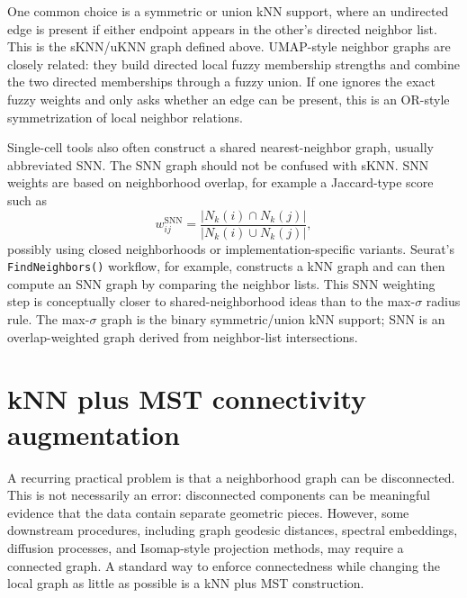 \documentclass[11pt]{article}
\begin{document}
One common choice is a symmetric or union kNN support, where an undirected edge is present if
either endpoint appears in the other's directed neighbor list.  This is the sKNN/uKNN graph
defined above.  UMAP-style neighbor graphs are closely related: they build directed local
fuzzy membership strengths and combine the two directed memberships through a fuzzy union.
If one ignores the exact fuzzy weights and only asks whether an edge can be present, this is
an OR-style symmetrization of local neighbor relations.

Single-cell tools also often construct a shared nearest-neighbor graph, usually abbreviated
SNN.  The SNN graph should not be confused with sKNN.  SNN weights are based on neighborhood
overlap, for example a Jaccard-type score such as
\[
  w^{\mathrm{SNN}}_{ij}
  =
  \frac{\lvert N_k(i)\cap N_k(j)\rvert}
       {\lvert N_k(i)\cup N_k(j)\rvert},
\]
possibly using closed neighborhoods or implementation-specific variants.  Seurat's
\texttt{FindNeighbors()} workflow, for example, constructs a kNN graph and can then compute
an SNN graph by comparing the neighbor lists.  This SNN weighting step is conceptually closer
to shared-neighborhood ideas than to the max-\(\sigma\) radius rule.  The max-\(\sigma\) graph
is the binary symmetric/union kNN support; SNN is an overlap-weighted graph derived from
neighbor-list intersections.

\section{kNN plus MST connectivity augmentation}

A recurring practical problem is that a neighborhood graph can be disconnected.  This is not
necessarily an error: disconnected components can be meaningful evidence that the data contain
separate geometric pieces.  However, some downstream procedures, including graph geodesic
distances, spectral embeddings, diffusion processes, and Isomap-style projection methods, may
require a connected graph.  A standard way to enforce connectedness while changing the local
graph as little as possible is a kNN plus MST construction.
\end{document}

